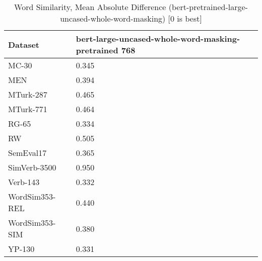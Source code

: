 \begin{table}[]
\centering
\begin{tabular}{l|l}
\hline
Dataset & bert-large-uncased-whole-word-masking-pretrained 768 \\
\hline
MC-30 & 0.345 \\ 
MEN & 0.394 \\ 
MTurk-287 & 0.465 \\ 
MTurk-771 & 0.464 \\ 
RG-65 & 0.334 \\ 
RW & 0.505 \\ 
SemEval17 & 0.365 \\ 
SimVerb-3500 & 0.950 \\ 
Verb-143 & 0.332 \\ 
WordSim353-REL & 0.440 \\ 
WordSim353-SIM & 0.380 \\ 
YP-130 & 0.331
\end{tabular}
\caption{Word Similarity, Mean Absolute Difference (bert-pretrained-large-uncased-whole-word-masking) [0 is best]}
\label{tab:similarity-bert-pretrained-large-uncased-whole-word-masking}
\end{table}
